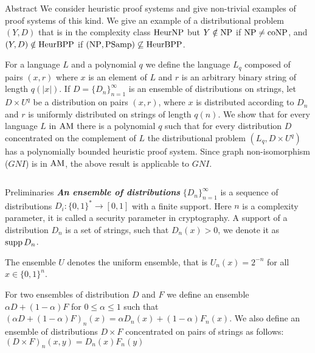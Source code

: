 \begin{frame}{}

    \begin{block}{Abstract} \justifying
        We consider heuristic proof
		systems and give non-trivial examples of proof
        systems of this kind. We give an example of a distributional problem $(Y,D)$
        that is in the complexity class $\rm HeurNP$ but $Y\notin \rm NP$ if $\rm
        NP \neq coNP$, and $(Y, D)\notin \rm HeurBPP$ if $(\rm NP, PSamp) \not
        \subseteq HeurBPP$. 

		For a language $L$ and a polynomial $q$ we define the language $L_q$ composed
        of pairs $(x, r)$ where $x$ is an element of $L$ and $r$ is an arbitrary
        binary string of length $q(|x|)$.  If $D = \{D_n\}_{n=1}^\infty$ is an
        ensemble of distributions on strings, let $D \times U^q$ be a distribution on
        pairs $(x, r)$, where $x$ is distributed according to $D_n$ and $r$ is
        uniformly distributed on strings of length $q(n)$.  We show that for every
        language $L$ in $\rm AM$ there is a polynomial $q$ such that for every
        distribution $D$ concentrated on the complement of $L$ the distributional
        problem $(L_q, D \times U^q)$ has a polynomially bounded heuristic proof
        system. Since graph non-isomorphism ($GNI$) is in $\rm AM$, the above result
        is applicable to $GNI$.
    \end{block}

    
\begin{columns}[t]
	\begin{column}{0.32\linewidth}

            
		\begin{block}{Preliminaries}
                {\bf \em An ensemble of distributions} $\{D_n\}_{n=1}^{\infty}$ is a
                sequence of distributions $D_i : \{0,1\}^* \to [0, 1]$ with a finite
                support. Here $n$ is a complexity parameter, it is called a security
                parameter in cryptography. A support of a distribution $D_n$ is a set
                of strings, such that $D_n(x) > 0$, we denote it as $\operatorname*{supp} D_n$.

                The ensemble $U$ denotes the uniform ensemble, that is $U_n(x) =
                2^{-n}$ for all $x\in \{0,1\}^n$.

				For two ensembles of distribution $D$ and $F$ we define an ensemble
                $\alpha D + (1 - \alpha) F$ for $0 \le \alpha \le 1$ such that
                $(\alpha D + (1 - \alpha) F)_n(x) = \alpha D_n(x) + (1 - \alpha)
                F_n(x)$. We also define an ensemble of distributions $D \times F$
                concentrated on pairs of strings as follows: $(D \times F)_n(x, y) =
                D_n(x) F_n(y)$


\end{block}
\end{column}
\end{columns}
\end{frame}
